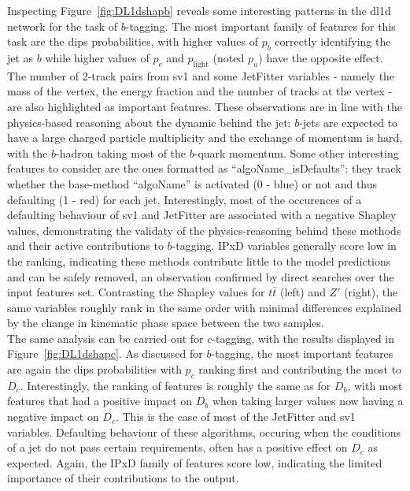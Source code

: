 Inspecting Figure~\ref{fig:DL1dshapb} reveals some interesting patterns in the \gls{dl1d} network for the task of $b$-tagging. The most important family of features for this task are the \gls{dips} probabilities, with higher values of $p_b$ correctly identifying the jet as $b$ while higher values of $p_c$ and $p_{\textrm{light}}$ (noted $p_u$) have the opposite effect. The number of 2-track pairs from \gls{sv1} and some JetFitter variables - namely the mass of the vertex, the energy fraction and the number of tracks at the vertex - are also highlighted as important features. These observations are in line with the physics-based reasoning about the dynamic behind the jet: $b$-jets are expected to have a large charged particle multiplicity and the exchange of momentum is hard, with the $b$-hadron taking most of the $b$-quark momentum. Some other interesting features to consider are the ones formatted as  ``algoName\_isDefaults'': they track whether the base-method ``algoName'' is activated (0 - blue) or not and thus defaulting (1 - red) for each jet. Interestingly, most of the occurences of a defaulting behaviour of \gls{sv1} and JetFitter are associated with a negative Shapley values, demonstrating the validaty of the physics-reasoning behind these methods and their active contributions to $b$-tagging. IPxD variables generally score low in the ranking, indicating these methods contribute little to the model predictions and can be safely removed, an observation confirmed by direct searches over the input features set. Contrasting the Shapley values for $t\bar{t}$ (left) and $Z'$ (right), the same variables roughly rank in the same order with minimal differences explained by the change in kinematic phase space between the two samples. \\

The same analysis can be carried out for $c$-tagging, with the results displayed in Figure~\ref{fig:DL1dshapc}. As discussed for $b$-tagging, the most important features are again the \gls{dips} probabilities with $p_c$ ranking first and contributing the most to $D_c$. Interestingly, the ranking of features is roughly the same as for $D_b$, with most features that had a positive impact on $D_b$ when taking larger values now having a negative impact on $D_c$. This is the case of most of the JetFitter and \gls{sv1} variables. Defaulting behaviour of these algorithms, occuring when the conditions of a jet do not pass certain requirements, often has a positive effect on $D_c$ as expected. Again, the IPxD family of features score low, indicating the limited importance of their contributions to the output. 

